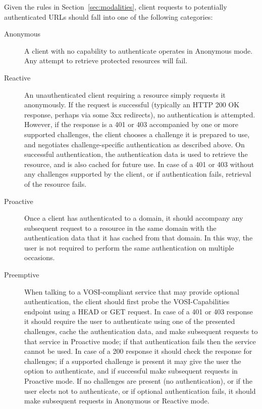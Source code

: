 \documentclass[11pt,a4paper]{ivoa}
\begin{document}
Given the rules in Section~\ref{sec:modalities},
client requests to potentially authenticated URLs should
fall into one of the following categories:
\begin{description}
\item[Anonymous]
      A client with no capability to authenticate operates in Anonymous mode.
      Any attempt to retrieve protected resources will fail.
\item[Reactive]
      An unauthenticated client requiring a
      resource simply requests it anonymously.
      If the request is successful
      (typically an HTTP 200 OK response, perhaps via some 3xx redirects),
      no authentication is attempted.
      However, if the response is a 401 or 403 accompanied by
      one or more supported challenges,
      the client chooses a challenge it is prepared to use,
      and negotiates challenge-specific authentication as described above.
      On successful authentication, the authentication data is used to
      retrieve the resource, and is also cached for future use.
      In case of a 401 or 403 without any challenges supported by the client,
      or if authentication fails, retrieval of the resource fails.
\item[Proactive]
      Once a client has authenticated to a domain,
      it should accompany any subsequent request to a resource
      in the same domain
      with the authentication data that it has cached from that domain.
      In this way, the user is not required to perform the same
      authentication on multiple occasions.
\item[Preemptive]
      When talking to a VOSI-compliant service that may provide
      optional authentication,
      the client should first probe the VOSI-Capabilities endpoint
      using a HEAD or GET request.
      In case of a 401 or 403 response
      it should require the user to authenticate
      using one of the presented challenges,
      cache the authentication data, and make subsequent requests
      to that service in Proactive mode;
      if that authentication fails then the service cannot be used.
      In case of a 200 response it should check the response for challenges;
      if a supported challenge is present it may give the user the
      option to authenticate, and if successful make subsequent requests
      in Proactive mode.
      If no challenges are present (no authentication),
      or if the user elects not to authenticate,
      or if optional authentication fails,
      it should make subsequent requests in Anonymous or Reactive mode.
\end{description}
\end{document}

